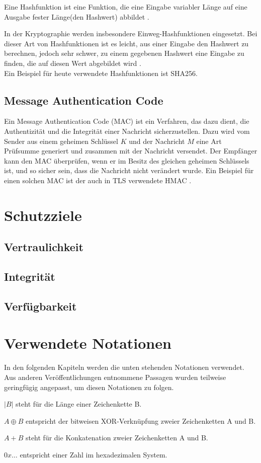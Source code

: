Eine Hashfunktion ist eine Funktion, die eine Eingabe variabler Länge auf eine Ausgabe fester Länge(den Hashwert) abbildet \cite{Schneier2006}.

In der Kryptographie werden insbesondere Einweg-Hashfunktionen eingesetzt. Bei dieser Art von Hashfunktionen ist es leicht, aus einer Eingabe den Hashwert zu berechnen, jedoch sehr schwer, zu einem gegebenen Hashwert eine Eingabe zu finden, die auf diesen Wert abgebildet wird \cite{Schneier2006}. \\Ein Beispiel für heute verwendete Hashfunktionen ist SHA256.

\subsection{Message Authentication Code}

\label{sec_mac}

Ein Message Authentication Code (MAC) ist ein Verfahren, das dazu dient, die Authentizität und die Integrität einer Nachricht sicherzustellen. Dazu wird vom Sender aus einem geheimen Schlüssel \(K\) und der Nachricht \(M\) eine Art Prüfsumme generiert und zusammen mit der Nachricht versendet. Der Empfänger kann den MAC überprüfen, wenn er im Besitz des gleichen geheimen Schlüssels ist, und so sicher sein, dass die Nachricht nicht verändert wurde. Ein Beispiel für einen solchen MAC ist der auch in TLS verwendete HMAC \cite{Schneier2006, ferguson10}.

\section{Schutzziele}

\subsection{Vertraulichkeit}

\subsection{Integrität}

\subsection{Verfügbarkeit}

\section{Verwendete Notationen}

In den folgenden Kapiteln werden die unten stehenden Notationen verwendet. Aus anderen Veröffentlichungen entnommene Passagen wurden teilweise geringfügig angepasst, um diesen Notationen zu folgen.

\(|B|\) steht für die Länge einer Zeichenkette B.

\(A \oplus B\) entspricht der bitweisen XOR-Verknüpfung zweier Zeichenketten A und B.

\(A + B\) steht für die Konkatenation zweier Zeichenketten A und B.

\(0x\dots\) entspricht einer Zahl im hexadezimalen System.

